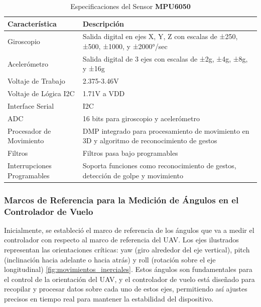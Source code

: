             \begin{table}[H]
                \centering
                \caption{Especificaciones del Sensor \textbf{MPU6050}}
                \label{tab:mpu6050_specs}
                \begin{tabular}{|l|l|}
                    \hline
                    \textbf{Característica} & \textbf{Descripción} \\ \hline
                    Giroscopio & Salida digital en ejes X, Y, Z con escalas de ±250, ±500, ±1000, y ±2000°/sec \\ \hline
                    Acelerómetro & Salida digital de 3 ejes con escalas de ±2g, ±4g, ±8g, y ±16g \\ \hline
                    Voltaje de Trabajo & 2.375-3.46V \\ \hline
                    Voltaje de Lógica I2C & 1.71V a VDD \\ \hline
                    Interface Serial & I2C \\ \hline
                    ADC & 16 bits para giroscopio y acelerómetro \\ \hline
                    Procesador de Movimiento & DMP integrado para procesamiento de movimiento en 3D y algoritmo de reconocimiento de gestos \\ \hline
                    Filtros & Filtros pasa bajo programables \\ \hline
                    Interrupciones Programables & Soporta funciones como reconocimiento de gestos, detección de golpe y movimiento \\ \hline
                \end{tabular}
            \end{table}


        \subsubsection{  Marcos de Referencia para la Medición de Ángulos en el Controlador de Vuelo} \vspace{5px}

            Inicialmente, se estableció el marco de referencia de los ángulos que va a medir el controlador con respecto al marco de referencia del UAV. Los ejes ilustrados representan las orientaciones críticas: yaw (giro alrededor del eje vertical), pitch (inclinación hacia adelante o hacia atrás) y roll (rotación sobre el eje longitudinal) \ref{fig:movimientos_inerciales}. Estos ángulos son fundamentales para el control de la orientación del UAV, y el controlador de vuelo está diseñado para recopilar y procesar datos sobre cada uno de estos ejes, permitiendo así ajustes precisos en tiempo real para mantener la estabilidad del dispositivo.


